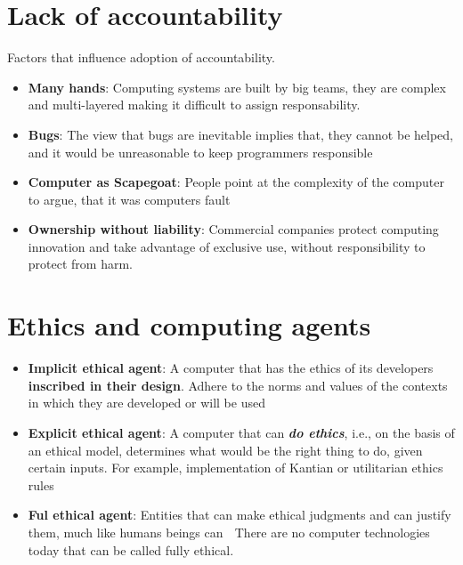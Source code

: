 \documentclass{article}
\begin{document}
\section{Lack of accountability}

\begin{flushleft}
Factors that influence adoption of accountability.
\begin{itemize}
  \item \textbf{Many hands}: Computing systems are built by big teams, they are complex and multi-layered making it difficult to assign responsability.
  \item \textbf{Bugs}: The view that bugs are inevitable implies that, they cannot be helped, and it would be unreasonable to keep programmers responsible
  \item \textbf{Computer as Scapegoat}: People point at the complexity of the computer to argue, that it was computers fault
  \item \textbf{Ownership without liability}: Commercial companies protect computing innovation and take advantage of exclusive use, without responsibility to protect from harm.
\end{itemize}
\end{flushleft}

\section{Ethics and computing agents}
\begin{itemize}
  \item \textbf{Implicit ethical agent}: A computer that has the ethics of its developers \textbf{inscribed in their design}. Adhere to the norms and values of the contexts in which they are developed or will be used
  \item \textbf{Explicit ethical agent}: A computer that can \textit{\textbf{do ethics}}, i.e., on the basis of an ethical model, determines what would be the right thing to do, given certain inputs. For example, implementation of Kantian or utilitarian ethics rules
  \item \textbf{Ful ethical agent}: Entities that can make ethical judgments and can justify them, much like humans beings can  There are no computer technologies today that can be called fully ethical.
\end{itemize}
\end{document}
